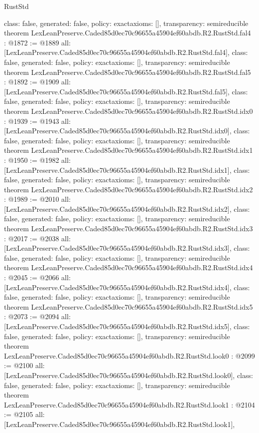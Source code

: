 \begin{lexlean}{RustStd}
\begin{coremodule}
{  class: false,
  generated: false,
  policy: exact{axioms: []},
  transparency: semireducible
}
theorem LexLeanPreserve.Caded85d0ec70c96655a45904ef60abdb.R2.RustStd.fal4 : @1872 := @1889 {
  all: [LexLeanPreserve.Caded85d0ec70c96655a45904ef60abdb.R2.RustStd.fal4],
  class: false,
  generated: false,
  policy: exact{axioms: []},
  transparency: semireducible
}
theorem LexLeanPreserve.Caded85d0ec70c96655a45904ef60abdb.R2.RustStd.fal5 : @1892 := @1909 {
  all: [LexLeanPreserve.Caded85d0ec70c96655a45904ef60abdb.R2.RustStd.fal5],
  class: false,
  generated: false,
  policy: exact{axioms: []},
  transparency: semireducible
}
theorem LexLeanPreserve.Caded85d0ec70c96655a45904ef60abdb.R2.RustStd.idx0 : @1939 := @1943 {
  all: [LexLeanPreserve.Caded85d0ec70c96655a45904ef60abdb.R2.RustStd.idx0],
  class: false,
  generated: false,
  policy: exact{axioms: []},
  transparency: semireducible
}
theorem LexLeanPreserve.Caded85d0ec70c96655a45904ef60abdb.R2.RustStd.idx1 : @1950 := @1982 {
  all: [LexLeanPreserve.Caded85d0ec70c96655a45904ef60abdb.R2.RustStd.idx1],
  class: false,
  generated: false,
  policy: exact{axioms: []},
  transparency: semireducible
}
theorem LexLeanPreserve.Caded85d0ec70c96655a45904ef60abdb.R2.RustStd.idx2 : @1989 := @2010 {
  all: [LexLeanPreserve.Caded85d0ec70c96655a45904ef60abdb.R2.RustStd.idx2],
  class: false,
  generated: false,
  policy: exact{axioms: []},
  transparency: semireducible
}
theorem LexLeanPreserve.Caded85d0ec70c96655a45904ef60abdb.R2.RustStd.idx3 : @2017 := @2038 {
  all: [LexLeanPreserve.Caded85d0ec70c96655a45904ef60abdb.R2.RustStd.idx3],
  class: false,
  generated: false,
  policy: exact{axioms: []},
  transparency: semireducible
}
theorem LexLeanPreserve.Caded85d0ec70c96655a45904ef60abdb.R2.RustStd.idx4 : @2045 := @2066 {
  all: [LexLeanPreserve.Caded85d0ec70c96655a45904ef60abdb.R2.RustStd.idx4],
  class: false,
  generated: false,
  policy: exact{axioms: []},
  transparency: semireducible
}
theorem LexLeanPreserve.Caded85d0ec70c96655a45904ef60abdb.R2.RustStd.idx5 : @2073 := @2094 {
  all: [LexLeanPreserve.Caded85d0ec70c96655a45904ef60abdb.R2.RustStd.idx5],
  class: false,
  generated: false,
  policy: exact{axioms: []},
  transparency: semireducible
}
theorem LexLeanPreserve.Caded85d0ec70c96655a45904ef60abdb.R2.RustStd.look0 : @2099 := @2100 {
  all: [LexLeanPreserve.Caded85d0ec70c96655a45904ef60abdb.R2.RustStd.look0],
  class: false,
  generated: false,
  policy: exact{axioms: []},
  transparency: semireducible
}
theorem LexLeanPreserve.Caded85d0ec70c96655a45904ef60abdb.R2.RustStd.look1 : @2104 := @2105 {
  all: [LexLeanPreserve.Caded85d0ec70c96655a45904ef60abdb.R2.RustStd.look1],
}
\end{coremodule}
\end{lexlean}
